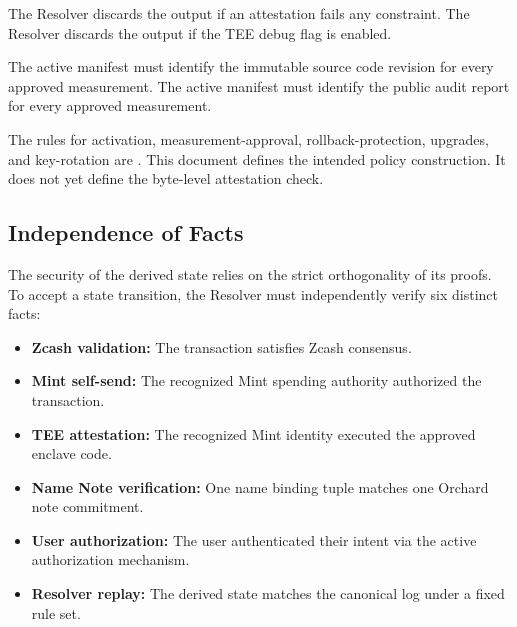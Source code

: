 The Resolver discards the output if an attestation fails any constraint. The Resolver discards the output if the TEE debug flag is enabled.

The active manifest must identify the immutable source code revision for every approved measurement. The active manifest must identify the public audit report for every approved measurement.

The rules for activation, measurement-approval, rollback-protection, upgrades, and key-rotation are \openstatus{}. This document defines the intended policy construction. It does not yet define the byte-level attestation check.

\subsection{Independence of Facts}

The security of the derived state relies on the strict orthogonality of its proofs. To accept a state transition, the Resolver must independently verify six distinct facts:

\begin{itemize}
  \item \textbf{Zcash validation:} The transaction satisfies Zcash consensus.
  \item \textbf{Mint self-send:} The recognized Mint spending authority authorized the transaction.
  \item \textbf{TEE attestation:} The recognized Mint identity executed the approved enclave code.
  \item \textbf{Name Note verification:} One name binding tuple matches one Orchard note commitment.
  \item \textbf{User authorization:} The user authenticated their intent via the active authorization mechanism.
  \item \textbf{Resolver replay:} The derived state matches the canonical log under a fixed rule set.
\end{itemize}
